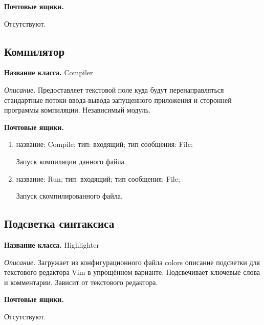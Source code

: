 \documentclass[12pt]{article}
\begin{document}
\textbf{Почтовые ящики.} 

Отсутствуют.

\subsection{Компилятор}

{\bf Название класса.} Compiler

\textit{Описание.} Предоставляет текстовой поле куда будут перенаправляться стандартные потоки ввода-вывода запущенного приложения и сторонней программы компиляции. Независимый модуль.

\textbf{Почтовые ящики.} 

\begin{enumerate}

\item название: Compile; тип: входящий; тип сообщения: File;

Запуск компиляции данного файла.

\item название: Run; тип: входящий; тип сообщения: File;

Запуск скомпилированного файла.

\end{enumerate}

\subsection{Подсветка синтаксиса}

{\bf Название класса.} Highlighter

\textit{Описание.} Загружает из конфигурационного файла colors описание подсветки для текстового редактора Vim в упрощённом варианте. Подсвечивает ключевые слова и комментарии. Зависит от текстового редактора.

\textbf{Почтовые ящики.} 

Отсутствуют.
\end{document}
